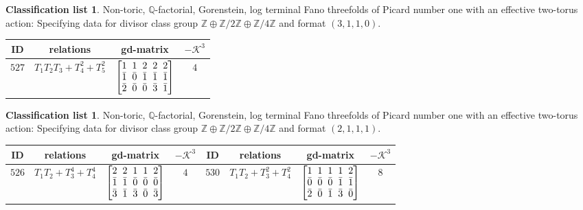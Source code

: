 \documentclass[pdftex]{sigma}%
\theoremstyle{definition}
\newtheorem{class-list}[thm]{Classification list}
\def\ZZ{{\mathbb Z}}
\def\QQ{{\mathbb Q}}
\numberwithin{equation}{section}
\begin{document}
\begin{class-list}
Non-toric, $\QQ$-factorial, Gorenstein, log terminal Fano
threefolds of Picard number one with an effective two-torus action:
Specifying data for divisor class group
$\ZZ\oplus \ZZ/2\ZZ\oplus \ZZ/4\ZZ$ and format $(3,1,1,0)$.
\begin{table}[h!]\centering\setlength{\tabcolsep}{5.5pt}
\renewcommand{\arraystretch}{1.1}\small\tabulinesep=1mm
\begin{tabu}{c|c|c|c}
\hline
ID&relations&gd-matrix&$-\mathcal{K}^3$
\\
\hline
${527}$&${T_{1}T_{2}T_{3}+T_{4}^{2}+T_{5}^{2}}$
&$\arraycolsep=1mm\begin{bmatrix}{1} & {1} & {2} & {2} & {2} \\ {\bar{1}} & {\bar{0}} & {\bar{1}} & {\bar{1}} & {\bar{1}} \\ {\bar{2}} & {\bar{0}} & {\bar{0}} & {\bar{3}} & {\bar{1}}\end{bmatrix}$
&${4}$
\\
\hline
\end{tabu}%
\end{table}
\end{class-list}


\begin{class-list}
Non-toric, $\QQ$-factorial, Gorenstein, log terminal Fano
threefolds of Picard number one with an effective two-torus action:
Specifying data for divisor class group
$\ZZ\oplus \ZZ/2\ZZ\oplus \ZZ/4\ZZ$ and format $(2,1,1,1)$.
\begin{table}[h!]\centering\setlength{\tabcolsep}{3.5pt}
\renewcommand{\arraystretch}{1.15}\small\tabulinesep=1mm
\begin{tabu}{c|c|c|c||c|c|c|c}
\hline
ID&relations&gd-matrix&$-\mathcal{K}^3$&ID&relations&gd-matrix&$-\mathcal{K}^3$
\\
\hline
${526}$&${T_{1}T_{2}+T_{3}^{4}+T_{4}^{4}}$
&$\arraycolsep=1mm\begin{bmatrix}{2} & {2} & {1} & {1} & {2} \\ {\bar{1}} & {\bar{1}} & {\bar{0}} & {\bar{0}} & {\bar{0}} \\ {\bar{3}} & {\bar{1}} & {\bar{3}} & {\bar{0}} & {\bar{3}}\end{bmatrix}$
&${4}$
&${530}$&${T_{1}T_{2}+T_{3}^{2}+T_{4}^{2}}$
&$\arraycolsep=1mm\begin{bmatrix}{1} & {1} & {1} & {1} & {2} \\ {\bar{0}} & {\bar{0}} & {\bar{0}} & {\bar{1}} & {\bar{1}} \\ {\bar{2}} & {\bar{0}} & {\bar{1}} & {\bar{3}} & {\bar{0}}\end{bmatrix}$
&${8}$
\\
\hline
\end{tabu}%
\end{table}
\end{class-list}
\end{document}
